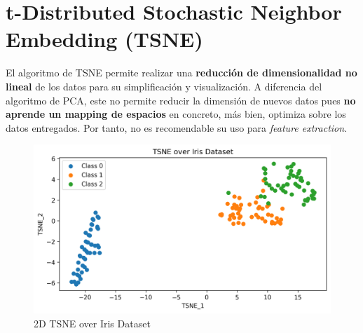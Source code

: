 \section{t-Distributed Stochastic Neighbor Embedding (TSNE)}

El algoritmo de TSNE permite realizar una \textbf{reducción de dimensionalidad no lineal} de los datos para su simplificación y visualización. A diferencia del algoritmo de PCA, este no permite reducir la dimensión de nuevos datos pues \textbf{no aprende un mapping de espacios} en concreto, más bien, optimiza sobre los datos entregados. Por tanto, no es recomendable su uso para \textit{feature extraction}.

\begin{figure}[H]
    \center
    \includegraphics[scale=0.5]{notebooks/ML/img/tsne_over_iris.png}
    \caption{2D TSNE over Iris Dataset}
\end{figure}






